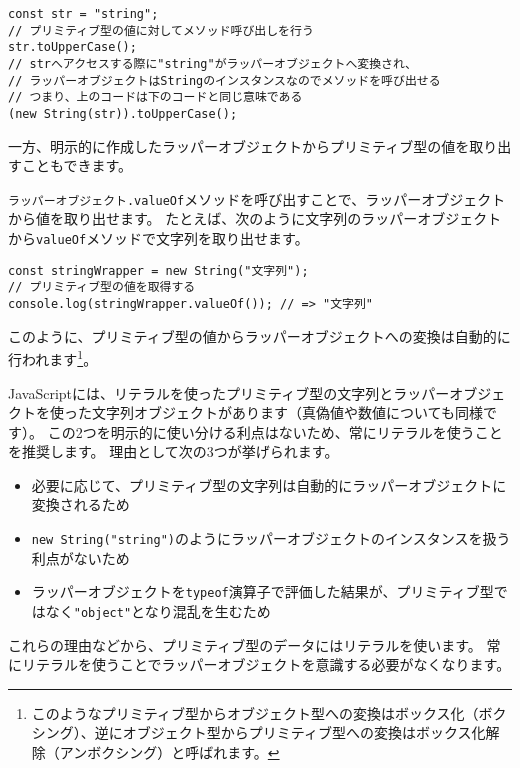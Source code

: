 \begin{lstlisting}
const str = "string";
// プリミティブ型の値に対してメソッド呼び出しを行う
str.toUpperCase();
// strへアクセスする際に"string"がラッパーオブジェクトへ変換され、
// ラッパーオブジェクトはStringのインスタンスなのでメソッドを呼び出せる
// つまり、上のコードは下のコードと同じ意味である
(new String(str)).toUpperCase();
\end{lstlisting}

一方、明示的に作成したラッパーオブジェクトからプリミティブ型の値を取り出すこともできます。

\texttt{ラッパーオブジェクト.valueOf}メソッドを呼び出すことで、ラッパーオブジェクトから値を取り出せます。
たとえば、次のように文字列のラッパーオブジェクトから\texttt{valueOf}メソッドで文字列を取り出せます。

\begin{lstlisting}
const stringWrapper = new String("文字列");
// プリミティブ型の値を取得する
console.log(stringWrapper.valueOf()); // => "文字列"
\end{lstlisting}

このように、プリミティブ型の値からラッパーオブジェクトへの変換は自動的に行われます\footnote{このようなプリミティブ型からオブジェクト型への変換はボックス化（ボクシング）、逆にオブジェクト型からプリミティブ型への変換はボックス化解除（アンボクシング）と呼ばれます。}。

JavaScriptには、リテラルを使ったプリミティブ型の文字列とラッパーオブジェクトを使った文字列オブジェクトがあります（真偽値や数値についても同様です）。
この2つを明示的に使い分ける利点はないため、常にリテラルを使うことを推奨します。
理由として次の3つが挙げられます。

\begin{itemize}
\item
  必要に応じて、プリミティブ型の文字列は自動的にラッパーオブジェクトに変換されるため
\item
  \texttt{new String("string")}のようにラッパーオブジェクトのインスタンスを扱う利点がないため
\item
  ラッパーオブジェクトを\texttt{typeof}演算子で評価した結果が、プリミティブ型ではなく\texttt{"object"}となり混乱を生むため
\end{itemize}

これらの理由などから、プリミティブ型のデータにはリテラルを使います。
常にリテラルを使うことでラッパーオブジェクトを意識する必要がなくなります。

